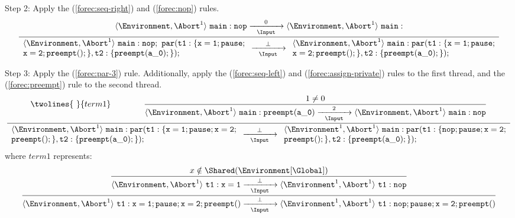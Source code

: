 \noindent
Step 2: Apply the (\ref{forec:seq-right}) and (\ref{forec:nop}) rules. 
\begin{equation*}
	\frac{
			\langle \Environment, \Abort^1 \rangle ~ \mathtt{main: nop}
				\xrightarrow[~~\Input~~]{0} 
			\langle \Environment, \Abort^1 \rangle ~ \mathtt{main: }
		}{
			\begin{array}{l}
				\langle \Environment, \Abort^1 \rangle ~ \mathtt{main: nop;~par( t1:\{x=1; pause;}	\\
				\mathtt{x=2; preempt();\}, t2:\{preempt(a\_0);\} );}								\\
			\end{array}
				\xrightarrow[~~\Input~~]{\bot} 
			\begin{array}{l}
				\langle \Environment, \Abort^1 \rangle ~ \mathtt{main: par( t1:\{x=1; pause;}		\\
				\mathtt{x=2; preempt();\}, t2:\{preempt(a\_0);\} );}								\\
			\end{array}
		}
\end{equation*}

\noindent
Step 3: Apply the (\ref{forec:par-3}) rule. Additionally, apply the 
(\ref{forec:seq-left}) and (\ref{forec:assign-private}) rules to the 
first thread, and the (\ref{forec:preempt}) rule to the second thread.
\begin{equation*}
	\frac{
			\twolines{
				~
			}{
				term1
			}
			\qquad
			\qquad
		\dfrac{
				1 \neq 0
			}{
				\langle \Environment, \Abort^1 \rangle ~ \mathtt{main: preempt(a\_0)}
					\xrightarrow[~~\Input~~]{2} 
				\langle \Environment, \Abort^1 \rangle ~ \mathtt{main: nop}
			}
		}{
			\begin{array}{l}
				\langle \Environment, \Abort^1 \rangle ~ \mathtt{main: par( t1:\{x=1; pause; x=2;}	\\
				\mathtt{preempt();\}, t2:\{preempt(a\_0);\} );}										\\
			\end{array}
				\xrightarrow[~~\Input~~]{\bot} 
			\begin{array}{l}
				\langle \Environment^1, \Abort^1 \rangle ~ \mathtt{main: par( t1:\{nop; pause; x=2;}\\
				\mathtt{preempt();\}, t2:\{preempt(a\_0);\} );}										\\
			\end{array}
		}
\end{equation*}
where $term1$ represents:
\begin{equation*}
	\frac{
			\dfrac{
				x \notin \Shared(\Environment[\Global])
			}{
				\langle \Environment, \Abort^1 \rangle ~ \mathtt{t1: x=1}
					\xrightarrow[~~\Input~~]{\bot} 
				\langle \Environment^1, \Abort^1 \rangle ~ \mathtt{t1: nop}
			}
		}{
			\langle \Environment, \Abort^1 \rangle ~ \mathtt{t1: x=1; pause;x=2; preempt()}
				\xrightarrow[~~\Input~~]{\bot} 
			\langle \Environment^1, \Abort^1 \rangle ~ \mathtt{t1: nop; pause;x=2; preempt()}
		}
\end{equation*}

